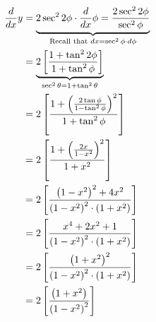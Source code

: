 \documentclass[14pt,fleqn]{extarticle}
\begin{document}
\begin{problem}
\begin{step}
     \begin{align}
	\frac{d}{dx} y &= \underbrace{2 \sec^2 2\phi \cdot \frac{d}{dx} \phi = \frac{2\sec^2 2\phi}{\sec^2\phi}}_{\text{Recall that } dx = \sec^2\phi\cdot d\phi}  \\
	&= \underbrace{2 \left[\dfrac{1 + \tan^2 2\phi}{1+\tan^2\phi} \right]}_{\sec^2\theta = 1 + \tan^2\theta} \\
	&= 2 \left[\dfrac{1 + \left(\frac{2\tan\phi}{1-\tan^2\phi} \right)^2}{1 + \tan^2\phi} \right] \\
	&= 2 \left[\dfrac{1 + \left(\frac{2x}{1-x^2} \right)^2}{1+x^2} \right] \\
	&= 2 \left[\dfrac{\left(1-x^2 \right)^2 + 4x^2}{\left(1-x^2 \right)^2\cdot \left(1+x^2 \right)} \right] \\
	&= 2 \left[\dfrac{x^4 + 2x^2 + 1}{\left(1-x^2 \right)^2\cdot \left(1+x^2 \right)} \right] \\
	&= 2 \left[\dfrac{\left(1+x^2 \right)^2}{\left(1-x^2 \right)^2\cdot \left(1+x^2 \right)} \right] \\
	&= 2 \left[\dfrac{\left(1+x^2 \right)}{\left(1-x^2 \right)^2} \right]
\end{align} 
\end{step}
\end{problem} 
\end{document}
